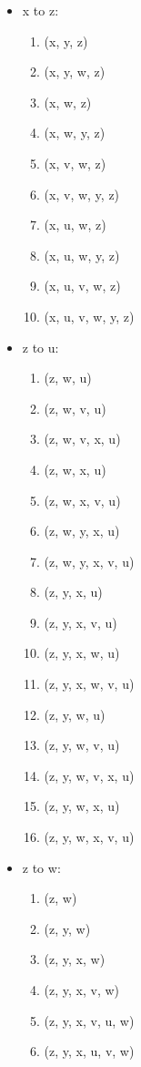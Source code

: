 \begin{enumerate}
    \begin{itemize}
        \item x to z:
        \begin{enumerate}
            \item (x, y, z)
            \item (x, y, w, z)
            \item (x, w, z)
            \item (x, w, y, z)
            \item (x, v, w, z)
            \item (x, v, w, y, z)
            \item (x, u, w, z)
            \item (x, u, w, y, z)
            \item (x, u, v, w, z)
            \item (x, u, v, w, y, z)
        \end{enumerate}
        \item z to u:
        \begin{enumerate}
            \item (z, w, u)
            \item (z, w, v, u)
            \item (z, w, v, x, u)
            \item (z, w, x, u)
            \item (z, w, x, v, u)
            \item (z, w, y, x, u)
            \item (z, w, y, x, v, u)
            \item (z, y, x, u)
            \item (z, y, x, v, u)
            \item (z, y, x, w, u)
            \item (z, y, x, w, v, u)
            \item (z, y, w, u)
            \item (z, y, w, v, u)
            \item (z, y, w, v, x, u)
            \item (z, y, w, x, u)
            \item (z, y, w, x, v, u)
        \end{enumerate}
        \item z to w:
        \begin{enumerate}
            \item (z, w)
            \item (z, y, w)
            \item (z, y, x, w)
            \item (z, y, x, v, w)
            \item (z, y, x, v, u, w)
            \item (z, y, x, u, v, w)
        \end{enumerate}
    \end{itemize}


\end{enumerate}
